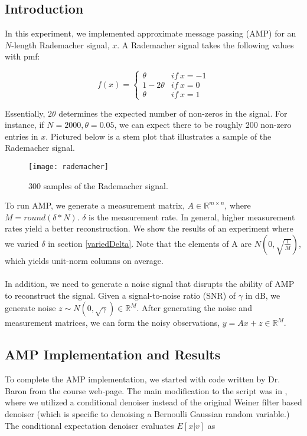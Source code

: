 \documentclass[]{../../ncmathy}
\begin{document}
\subsection{Introduction}
	In this experiment, we implemented approximate message passing (AMP) for an $N$-length Rademacher signal, $x$. A Rademacher signal takes the following values with pmf:
	
	\begin{equation}
		f(x) = \begin{cases} 
	      \theta & if \ x = -1 \\
	      1 - 2\theta & if \ x = 0\\
	      \theta & if \ x = 1
	   \end{cases}
	\end{equation}
	
	Essentially, $2\theta$ determines the expected number of non-zeros in the signal. For instance, if $N = 2000, \theta = 0.05$, we can expect there to be roughly 200 non-zero entries in $x$. Pictured below is a stem plot that illustrates a sample of the Rademacher signal.
	
	\begin{figure}[H]
	\centering\texttt{[image: rademacher]}
	\caption{300 samples of the Rademacher signal.}
	\end{figure}
	
	To run AMP, we generate a measurement matrix, $A \in \mathbb{R}^{m\times n}$, where $M = round(\delta*N)$. $\delta$ is the measurement rate. In general, higher measurement rates yield a better reconstruction. We show the results of an experiment where we varied $\delta$ in section \ref{variedDelta}. Note that the elements of A are $N(0, \sqrt{\frac{1}{M}})$, which yields unit-norm columns on average.
	\\\\
	In addition, we need to generate a noise signal that disrupts the ability of AMP to reconstruct the signal. Given a signal-to-noise ratio (SNR) of $\gamma$ in dB, we generate noise $z \sim N(0,\sqrt{\gamma}) \in \mathbb{R}^{M}$. After generating the noise and measurement matrices, we can form the noisy observations, $y = Ax + z \in \mathbb{R}^{M}$. 
	
\subsection{AMP Implementation and Results}
	To complete the AMP implementation, we started with code written by Dr. Baron from the course web-page. The main modification to the script was in , where we utilized a conditional denoiser instead of the original Weiner filter based denoiser (which is specific to denoising a Bernoulli Gaussian random variable.) The conditional expectation denoiser evaluates $E[x|v]$ as
	
\end{document}
